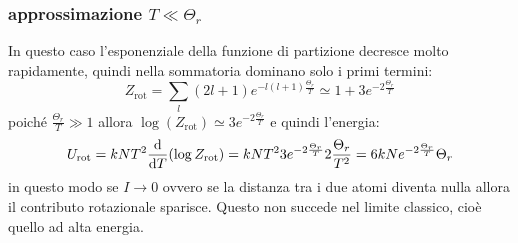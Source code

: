 \subsubsection{approssimazione $T\ll\Theta_r$}
In questo caso l'esponenziale della funzione di partizione decresce molto rapidamente, quindi nella sommatoria dominano solo i primi termini:
\begin{equation}
	Z_\text{rot} = \sum_l(2l+1)e^{-l(l+1)\frac{\Theta_r}{T}}\simeq 1+3e^{-2\frac{\Theta_r}{T}}
\end{equation}
poiché $\frac{\Theta_r}{T}\gg 1$ allora $\log(Z_\text{rot})\simeq 3e^{-2\frac{\Theta_r}{T}}$
e quindi l'energia:
\begin{equation}
	U_\text{rot}=kNT^2\frac{\mathrm{d}}{\mathrm{d} T}(\log Z_\text{rot}) = kNT^2 3e^{-2\frac{\Theta_r}{T}} 2\frac{\Theta_r}{T^2} = 6kN e^{-2\frac{\Theta_r}{T}} \Theta_r
\end{equation}
in questo modo se $I\to 0$ ovvero se la distanza tra i due atomi diventa nulla allora il contributo rotazionale sparisce. Questo non succede nel limite classico, cioè quello ad alta energia.
